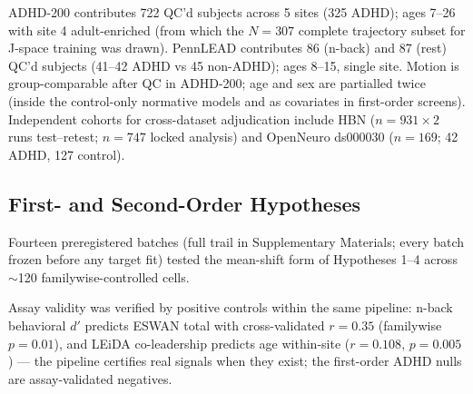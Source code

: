 \documentclass{article}
\begin{document}
ADHD-200 contributes 722 QC'd subjects across 5 sites (325 ADHD); ages 7--26 with site 4 adult-enriched (from which the $N{=}307$ complete trajectory subset for J-space training was drawn). PennLEAD contributes 86 (n-back) and 87 (rest) QC'd subjects (41--42 ADHD vs 45 non-ADHD); ages 8--15, single site. Motion is group-comparable after QC in ADHD-200; age and sex are partialled twice (inside the control-only normative models and as covariates in first-order screens). Independent cohorts for cross-dataset adjudication include HBN ($n{=}931\times 2$ runs test--retest; $n{=}747$ locked analysis) and OpenNeuro ds000030 ($n{=}169$; 42 ADHD, 127 control).

\subsection{First- and Second-Order Hypotheses}

Fourteen preregistered batches (full trail in Supplementary Materials; every batch frozen before any target fit) tested the mean-shift form of Hypotheses 1--4 across $\sim$120 familywise-controlled cells.

Assay validity was verified by positive controls within the same pipeline: n-back behavioral $d'$ predicts ESWAN total with cross-validated $r{=}0.35$ (familywise $p{=}0.01$), and LEiDA co-leadership predicts age within-site ($r{=}0.108$, $p{=}0.005$) --- the pipeline certifies real signals when they exist; the first-order ADHD nulls are assay-validated negatives.

\end{document}
